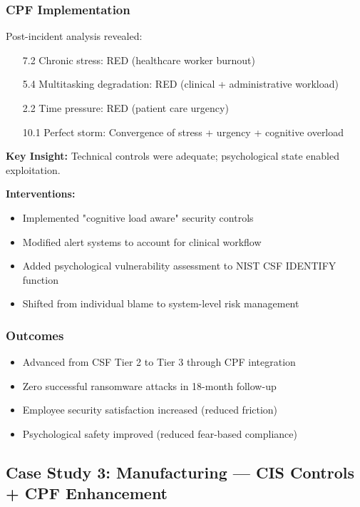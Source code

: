 \documentclass[11pt,a4paper]{article}
\begin{document}
\subsubsection{CPF Implementation}

Post-incident analysis revealed:
\begin{itemize}
\item [7.2] Chronic stress: RED (healthcare worker burnout)
\item [5.4] Multitasking degradation: RED (clinical + administrative workload)
\item [2.2] Time pressure: RED (patient care urgency)
\item [10.1] Perfect storm: Convergence of stress + urgency + cognitive overload
\end{itemize}

\textbf{Key Insight:} Technical controls were adequate; psychological state enabled exploitation.

\textbf{Interventions:}
\begin{itemize}
\item Implemented "cognitive load aware" security controls
\item Modified alert systems to account for clinical workflow
\item Added psychological vulnerability assessment to NIST CSF IDENTIFY function
\item Shifted from individual blame to system-level risk management
\end{itemize}

\subsubsection{Outcomes}

\begin{itemize}
\item Advanced from CSF Tier 2 to Tier 3 through CPF integration
\item Zero successful ransomware attacks in 18-month follow-up
\item Employee security satisfaction increased (reduced friction)
\item Psychological safety improved (reduced fear-based compliance)
\end{itemize}

\subsection{Case Study 3: Manufacturing --- CIS Controls + CPF Enhancement}
\end{document}
